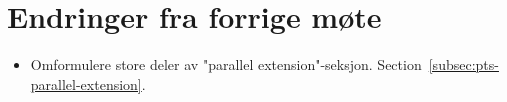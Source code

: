 
\chapter*{Endringer fra forrige møte}

\begin{itemize}
    \item Omformulere store deler av "parallel extension"-seksjon.
    Section~\vref{subsec:pts-parallel-extension}.
\end{itemize}

